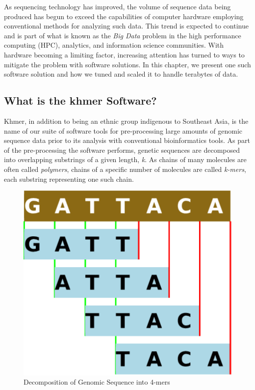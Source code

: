 \documentclass{article}
\begin{document}
As sequencing technology has improved, the volume of sequence data being produced has begun to exceed the capabilities of computer hardware employing conventional methods for analyzing such data. This trend is expected to continue and is part of what is known as the \textit{Big Data} \citep{web:bigdata} problem in the high performance computing (HPC), analytics, and information science communities. With hardware becoming a limiting factor, increasing attention has turned to ways to mitigate the problem with software solutions. In this chapter, we present one such software solution and how we tuned and scaled it to handle terabytes of data.

\subsection{What is the khmer Software?}

Khmer, in addition to being an ethnic group indigenous to Southeast Asia, is the name of our suite of software tools \citep{web:khmer} for pre-processing large amounts of genomic sequence data prior to its analysis with conventional bioinformatics tools. As part of the pre-processing the software performs, genetic sequences are decomposed into overlapping substrings of a given length, \textit{k}. As chains of many molecules are often called \textit{polymers}, chains of a specific number of molecules are called \textit{k-mers}, each substring representing one such chain. 

\begin{figure}[ht!]
\centering
\includegraphics[scale=0.5]{kmers.pdf}
\caption{Decomposition of Genomic Sequence into 4-mers}
\label{kmers}
\end{figure}
\end{document}
